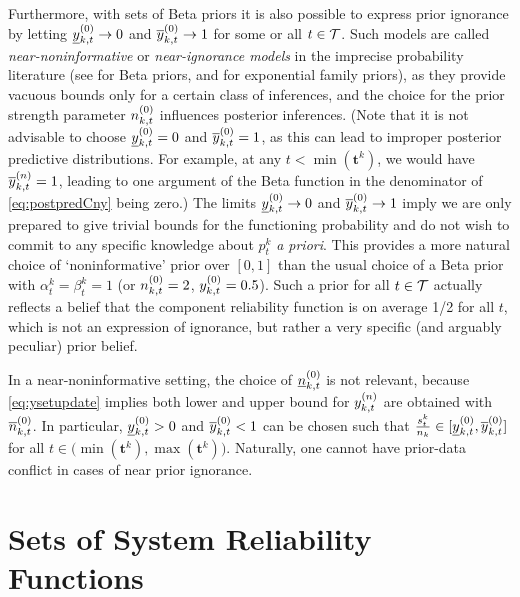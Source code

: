 \documentclass[12pt, a4paper]{elsarticle}
\newcommand{\bs}[1]{\boldsymbol{#1}}
\renewcommand{\vec}[1]{{\bs#1}}
\newcommand{\td}[1]{%
  \iftoggle{td}{%
    \todo[inline]{#1}%
  }{}%
}
\begin{document}
Furthermore, with sets of Beta priors it is also possible
to express prior ignorance
by letting $\underline{y}^{(0)}_{k,t} \to 0$ and $\overline{y}^{(0)}_{k,t} \to 1$
for some or all $t \in {\cal T}$.
Such models are called \emph{near-noninformative} or \emph{near-ignorance models} in the imprecise probability literature
(see \citet[\S5.3.2]{1991:walley} for Beta priors,
and \citet{2012:benavolizaffalon,2015:benavolizaffalon} for exponential family priors),
as they provide vacuous bounds only for a certain class of inferences,
and the choice for the prior strength parameter $n^{(0)}_{k,t}$ influences posterior inferences.
(Note that it is not advisable to choose $\underline{y}^{(0)}_{k,t} = 0$ and $\overline{y}^{(0)}_{k,t} = 1$,
as this can lead to improper posterior predictive distributions.
For example, at any $t < \min(\vec{t}^k)$,
we would have $\overline{y}^{(n)}_{k,t} = 1$, leading to one argument of the Beta function
in the denominator of \eqref{eq:postpredCny} being zero.)
The limits $\underline{y}^{(0)}_{k,t} \to 0$ and $\overline{y}^{(0)}_{k,t} \to 1$ imply we are only prepared to give trivial bounds for the functioning probability
and do not wish to commit to any specific knowledge about $p^k_t$ \emph{a priori}.
This provides a more natural choice of `noninformative' prior over $[0,1]$ than the usual choice of
a Beta prior with $\alpha^k_t = \beta^k_t = 1$ (or $n^{(0)}_{k,t} = 2$, $y^{(0)}_{k,t} = 0.5$).
Such a prior for all $t \in {\cal T}$ actually reflects a belief that the component reliability function
is on average 1/2 for all $t$, which is not an expression of ignorance, but rather a very specific (and arguably peculiar) prior belief.

%
In a near-noninformative setting, the choice of $\underline{n}^{(0)}_{k,t}$ is not relevant,
because \eqref{eq:ysetupdate} implies both lower and upper bound for $y^{(n)}_{k,t}$ are obtained with $\overline{n}^{(0)}_{k,t}$.
In particular, $\underline{y}^{(0)}_{k,t} > 0$ and $\overline{y}^{(0)}_{k,t} < 1$ can be chosen such that
$\frac{s^k_t}{n_k} \in [\underline{y}^{(0)}_{k,t}, \overline{y}^{(0)}_{k,t}]$ for all $t \in \big(\min(\vec{t}^k), \max(\vec{t}^k)\big)$.
Naturally, one cannot have prior-data conflict in cases of near prior ignorance.


\section{Sets of System Reliability Functions}
\label{sec:setsofrel}
\end{document}
